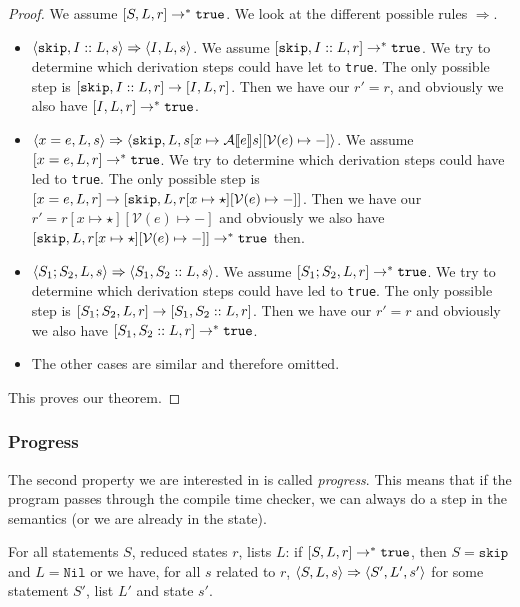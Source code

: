 \begin{proof}
We assume $[ S, L, r ] \to ^* \texttt{true}$. We look at the different possible rules $\Rightarrow$. 
\begin{itemize}[noitemsep]
    \item $\langle \texttt{skip}, I::L, s \rangle \Rightarrow \langle I, L, s \rangle$. We assume $[ \texttt{skip}, I::L, r ] \to ^* \texttt{true}$. We try to determine which derivation steps could have let to \texttt{true}. The only possible step is $[ \texttt{skip}, I::L, r ]\to [ I, L, r ]$. Then we have our $r' = r$, and obviously we also have $[ I, L, r ] \to^* \texttt{true}$.
    
    \item $\langle x = e, L, s \rangle \Rightarrow \langle \texttt{skip}, L, s[x \mapsto \mathcal{A} \llbracket e \rrbracket s][\mathcal{V}(e)\mapsto-] \rangle$. We assume $[ x = e, L, r ] \to ^* \texttt{true}$. We try to determine which derivation steps could have led to \texttt{true}. The only possible step is $[ x=e, L, r ] \to [ \texttt{skip}, L, r[x\mapsto \star][\mathcal{V}(e) \mapsto -] ]$. Then we have our $r' = r[x\mapsto \star][\mathcal{V}(e) \mapsto -]$ and obviously we also have $[ \texttt{skip}, L, r[x\mapsto \star][\mathcal{V}(e) \mapsto -] ] \to^* \texttt{true}$ then.
    
    \item $\langle S_1; S_2, L, s \rangle \Rightarrow \langle S_1, S_2::L, s \rangle$. We assume $[ S_1; S_2, L, r ] \to ^* \texttt{true}$. We try to determine which derivation steps could have led to \texttt{true}. The only possible step is $[ S_1; S_2, L, r ] \to [ S_1, S_2::L, r ]$. Then we have our $r' = r$ and obviously we also have $[ S_1, S_2::L, r ] \to^* \texttt{true}$.
    \item The other cases are similar and therefore omitted.
\end{itemize}
This proves our theorem.
\end{proof}

\subsubsection{Progress}
The second property we are interested in is called \emph{progress}. This means that if the program passes through the compile time checker, we can always do a step in the semantics (or we are already in the \sk state). 

\begin{theorem}
\label{progress}
For all statements $S$, reduced states $r$, lists $L$: if $[ S, L, r ] \to ^* \texttt{true}$, then $S = \texttt{skip}$ and $L = \texttt{Nil}$ or we have, for all $s$ related to $r$, $\langle S, L, s \rangle \Rightarrow \langle S', L', s' \rangle$ for some statement $S'$, list $L'$ and state $s'$.
\end{theorem}


